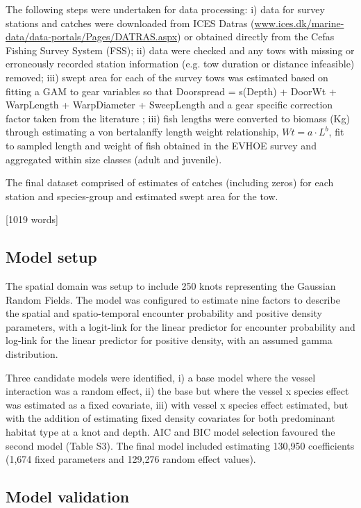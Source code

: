 \documentclass{nature}
\begin{document}
\begin{linenumbers}
The following steps were undertaken for data processing: i) data for survey
stations and catches were downloaded from ICES Datras
(\url{www.ices.dk/marine-data/data-portals/Pages/DATRAS.aspx}) or obtained
directly from the Cefas Fishing Survey System (FSS); ii) data were checked and
any tows with missing or erroneously recorded station information (e.g. tow
duration or distance infeasible) removed; iii) swept area for each of the
survey tows was estimated based on fitting a GAM to gear variables so that
Doorspread = s(Depth) + DoorWt + WarpLength + WarpDiameter + SweepLength and a
gear specific correction factor taken from the literature \cite{Piet2009}; iii)
fish lengths were converted to biomass (Kg) through estimating a von
bertalanffy length weight relationship, $Wt = a \cdot L^{b}$, fit to sampled
length and weight of fish obtained in the EVHOE survey and aggregated within
size classes (adult and juvenile). 

The final dataset comprised of estimates of catches (including zeros) for each
station and species-group and estimated swept area for the tow.

[1019 words]

\subsection{Model setup}

The spatial domain was setup to include 250 knots representing the Gaussian
Random Fields. The model was configured to estimate nine factors to describe
the spatial and spatio-temporal encounter probability and positive density
parameters, with a logit-link for the linear predictor for encounter
probability and log-link for the linear predictor for positive density, with an
assumed gamma distribution.

Three candidate models were identified, i) a base model where the vessel
interaction was a random effect, ii) the base but where the vessel x species
effect was estimated as a fixed covariate, iii) with vessel x species effect
estimated, but with the addition of estimating fixed density covariates for
both predominant habitat type at a knot and depth. AIC and BIC model selection
favoured the second model (Table S3). The final model included estimating
130,950 coefficients (1,674 fixed parameters and 129,276 random effect values).

\subsection{Model validation}


\end{linenumbers}
\end{document}
